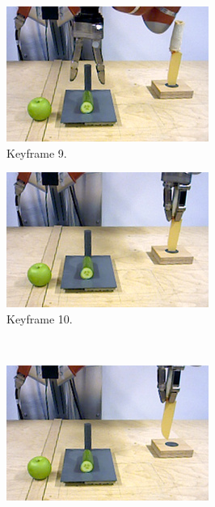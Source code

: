 \begin{figure}
\begin{subfigure}[t]{0.475\textwidth}
    \includegraphics[width=\textwidth]{./figures/sec/planning/exec4/frame2951.jpg}
    \caption{Keyframe 9.}
    \label{fig:sec_usingaffordanceforplanning_results_scenario4_9}
  \end{subfigure}
  \hfill
  \begin{subfigure}[t]{0.475\textwidth}
    \includegraphics[width=\textwidth]{./figures/sec/planning/exec4/frame3888.jpg}
    \caption{Keyframe 10.}
    \label{fig:sec_usingaffordanceforplanning_results_scenario4_10}
  \end{subfigure}\\%
  \begin{subfigure}[t]{0.475\textwidth}
    \includegraphics[width=\textwidth]{./figures/sec/planning/exec4/frame4024.jpg}

\end{subfigure}
\end{figure}
